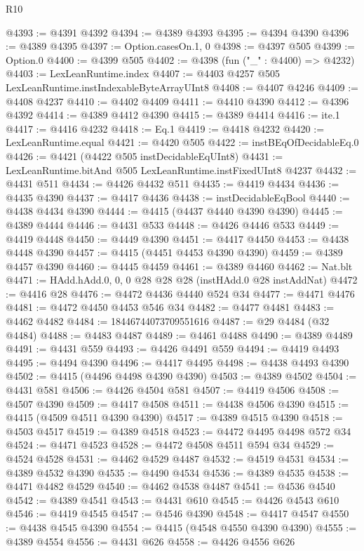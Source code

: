 \begin{lexlean}{R10}
\begin{coremodule}
@4393 := @4391 @4392
@4394 := @4389 @4393
@4395 := @4394 @4390
@4396 := @4389 @4395
@4397 := Option.casesOn.{1, 0}
@4398 := @4397 @505
@4399 := Option.{0}
@4400 := @4399 @505
@4402 := @4398 (fun ("_" : @4400) => @4232)
@4403 := LexLeanRuntime.index
@4407 := @4403 @4257 @505 LexLeanRuntime.instIndexableByteArrayUInt8
@4408 := @4407 @4246
@4409 := @4408 @4237
@4410 := @4402 @4409
@4411 := @4410 @4390
@4412 := @4396 @4392
@4414 := @4389 @4412 @4390
@4415 := @4389 @4414
@4416 := ite.{1}
@4417 := @4416 @4232
@4418 := Eq.{1}
@4419 := @4418 @4232
@4420 := LexLeanRuntime.equal
@4421 := @4420 @505
@4422 := instBEqOfDecidableEq.{0}
@4426 := @4421 (@4422 @505 instDecidableEqUInt8)
@4431 := LexLeanRuntime.bitAnd @505 LexLeanRuntime.instFixedUInt8 @4237
@4432 := @4431 @511
@4434 := @4426 @4432 @511
@4435 := @4419 @4434
@4436 := @4435 @4390
@4437 := @4417 @4436
@4438 := instDecidableEqBool
@4440 := @4438 @4434 @4390
@4444 := @4415 (@4437 @4440 @4390 @4390)
@4445 := @4389 @4444
@4446 := @4431 @533
@4448 := @4426 @4446 @533
@4449 := @4419 @4448
@4450 := @4449 @4390
@4451 := @4417 @4450
@4453 := @4438 @4448 @4390
@4457 := @4415 (@4451 @4453 @4390 @4390)
@4459 := @4389 @4457 @4390
@4460 := @4445 @4459
@4461 := @4389 @4460
@4462 := Nat.blt
@4471 := HAdd.hAdd.{0, 0, 0} @28 @28 @28 (instHAdd.{0} @28 instAddNat)
@4472 := @4416 @28
@4476 := @4472 @4436 @4440 @524 @34
@4477 := @4471 @4476
@4481 := @4472 @4450 @4453 @546 @34
@4482 := @4477 @4481
@4483 := @4462 @4482
@4484 := 18446744073709551616
@4487 := @29 @4484 (@32 @4484)
@4488 := @4483 @4487
@4489 := @4461 @4488
@4490 := @4389 @4489
@4491 := @4431 @559
@4493 := @4426 @4491 @559
@4494 := @4419 @4493
@4495 := @4494 @4390
@4496 := @4417 @4495
@4498 := @4438 @4493 @4390
@4502 := @4415 (@4496 @4498 @4390 @4390)
@4503 := @4389 @4502
@4504 := @4431 @581
@4506 := @4426 @4504 @581
@4507 := @4419 @4506
@4508 := @4507 @4390
@4509 := @4417 @4508
@4511 := @4438 @4506 @4390
@4515 := @4415 (@4509 @4511 @4390 @4390)
@4517 := @4389 @4515 @4390
@4518 := @4503 @4517
@4519 := @4389 @4518
@4523 := @4472 @4495 @4498 @572 @34
@4524 := @4471 @4523
@4528 := @4472 @4508 @4511 @594 @34
@4529 := @4524 @4528
@4531 := @4462 @4529 @4487
@4532 := @4519 @4531
@4534 := @4389 @4532 @4390
@4535 := @4490 @4534
@4536 := @4389 @4535
@4538 := @4471 @4482 @4529
@4540 := @4462 @4538 @4487
@4541 := @4536 @4540
@4542 := @4389 @4541
@4543 := @4431 @610
@4545 := @4426 @4543 @610
@4546 := @4419 @4545
@4547 := @4546 @4390
@4548 := @4417 @4547
@4550 := @4438 @4545 @4390
@4554 := @4415 (@4548 @4550 @4390 @4390)
@4555 := @4389 @4554
@4556 := @4431 @626
@4558 := @4426 @4556 @626

\end{coremodule}
\end{lexlean}
